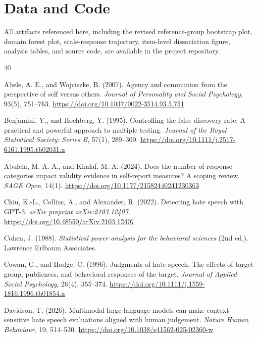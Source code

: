 \documentclass[a4paper,fleqn,review]{cas-sc}
\begin{document}
\section*{Data and Code}
All artifacts referenced here, including the revised reference-group bootstrap plot, domain forest plot, scale-response trajectory, item-level dissociation figure, analysis tables, and source code, are available in the project repository.

\begin{thebibliography}{40}

Abele, A. E., and Wojciszke, B. (2007).
Agency and communion from the perspective of self versus others.
\emph{Journal of Personality and Social Psychology}, 93(5), 751--763.
\url{https://doi.org/10.1037/0022-3514.93.5.751}

Benjamini, Y., and Hochberg, Y. (1995).
Controlling the false discovery rate: A practical and powerful approach to multiple testing.
\emph{Journal of the Royal Statistical Society: Series B}, 57(1), 289--300.
\url{https://doi.org/10.1111/j.2517-6161.1995.tb02031.x}

Abulela, M. A. A., and Khalaf, M. A. (2024).
Does the number of response categories impact validity evidence in self-report measures? A scoping review.
\emph{SAGE Open}, 14(1).
\url{https://doi.org/10.1177/21582440241230363}

Chiu, K.-L., Collins, A., and Alexander, R. (2022).
Detecting hate speech with GPT-3.
\emph{arXiv preprint arXiv:2103.12407}.
\url{https://doi.org/10.48550/arXiv.2103.12407}

Cohen, J. (1988).
\emph{Statistical power analysis for the behavioral sciences} (2nd ed.).
Lawrence Erlbaum Associates.

Cowan, G., and Hodge, C. (1996).
Judgments of hate speech: The effects of target group, publicness, and behavioral responses of the target.
\emph{Journal of Applied Social Psychology}, 26(4), 355--374.
\url{https://doi.org/10.1111/j.1559-1816.1996.tb01854.x}

Davidson, T. (2026).
Multimodal large language models can make context-sensitive hate speech evaluations aligned with human judgement.
\emph{Nature Human Behaviour}, 10, 514--530.
\url{https://doi.org/10.1038/s41562-025-02360-w}


\end{thebibliography}
\end{document}
